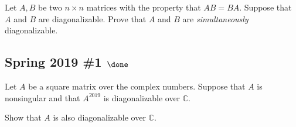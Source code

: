 Let \(A, B\) be two \(n\times n\) matrices with the property that
\(AB = BA\). Suppose that \(A\) and \(B\) are diagonalizable. Prove that
\(A\) and \(B\) are \emph{simultaneously} diagonalizable.

\hypertarget{spring-2019-1-done}{%
\subsection{\texorpdfstring{Spring 2019 \#1
\(\done\)}{Spring 2019 \#1 \textbackslash done}}\label{spring-2019-1-done}}

Let \(A\) be a square matrix over the complex numbers. Suppose that
\(A\) is nonsingular and that \(A^{2019}\) is diagonalizable over
\({\mathbb{C}}\).

Show that \(A\) is also diagonalizable over \({\mathbb{C}}\).

